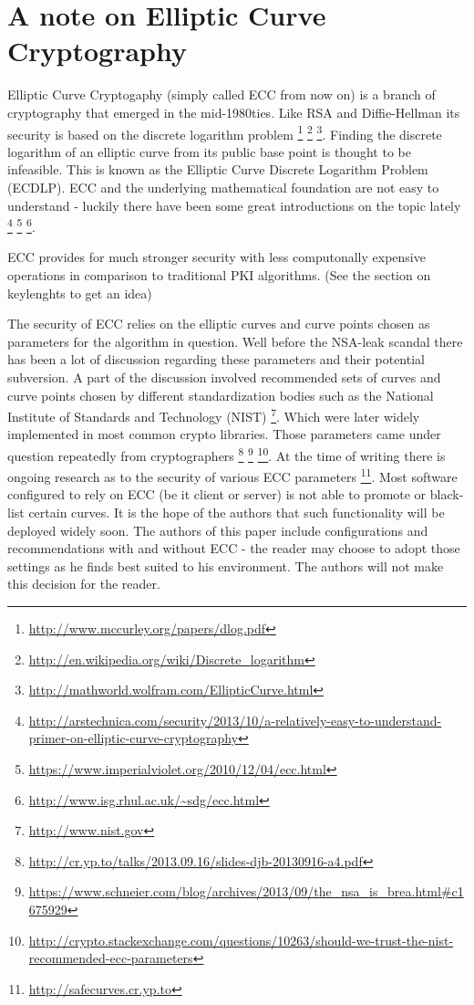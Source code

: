 \section{A note on Elliptic Curve Cryptography}
\label{section:EllipticCurveCryptography}

Elliptic Curve Cryptogaphy (simply called ECC from now on) is a branch of 
cryptography that emerged in the mid-1980ties. Like RSA and Diffie-Hellman 
its security is based on the discrete logarithm problem
\footnote{\url{http://www.mccurley.org/papers/dlog.pdf}} 
\footnote{\url{http://en.wikipedia.org/wiki/Discrete\_logarithm}}
\footnote{\url{http://mathworld.wolfram.com/EllipticCurve.html}}.
Finding the discrete logarithm of an elliptic curve from its public base
point is thought to be infeasible. This is known as the Elliptic Curve Discrete 
Logarithm Problem (ECDLP). ECC and the underlying mathematical foundation are not easy 
to understand - luckily there have been some great introductions on the topic lately
\footnote{\url{http://arstechnica.com/security/2013/10/a-relatively-easy-to-understand-primer-on-elliptic-curve-cryptography}}
\footnote{\url{https://www.imperialviolet.org/2010/12/04/ecc.html}}
\footnote{\url{http://www.isg.rhul.ac.uk/~sdg/ecc.html}}.

ECC provides for much stronger security with less computonally expensive
operations in comparison to traditional PKI algorithms. (See the section 
on keylenghts to get an idea)


The security of ECC relies on the elliptic curves and curve points chosen
as parameters for the algorithm in question. Well before the NSA-leak scandal
there has been a lot of discussion regarding these parameters and their 
potential subversion. A part of the discussion involved recommended sets 
of curves and curve points chosen by different standardization bodies such 
as the National Institute of Standards and Technology (NIST) 
\footnote{\url{http://www.nist.gov}}. Which were later widely implemented 
in most common crypto libraries. Those parameters came under question 
repeatedly from cryptographers
\footnote{\url{http://cr.yp.to/talks/2013.09.16/slides-djb-20130916-a4.pdf}}
\footnote{\url{https://www.schneier.com/blog/archives/2013/09/the\_nsa\_is\_brea.html\#c1675929}}
\footnote{\url{http://crypto.stackexchange.com/questions/10263/should-we-trust-the-nist-recommended-ecc-parameters}}.
At the time of writing there is ongoing research as to the security of 
various ECC parameters
\footnote{\url{http://safecurves.cr.yp.to}}. 
Most software configured to rely on ECC (be it client or server) is
not able to promote or black-list certain curves. It is the hope of
the authors that such functionality will be deployed widely soon.
The authors of this paper include configurations and recommendations
with and without ECC - the reader may choose to adopt those settings
as he finds best suited to his environment. The authors will not make
this decision for the reader.


